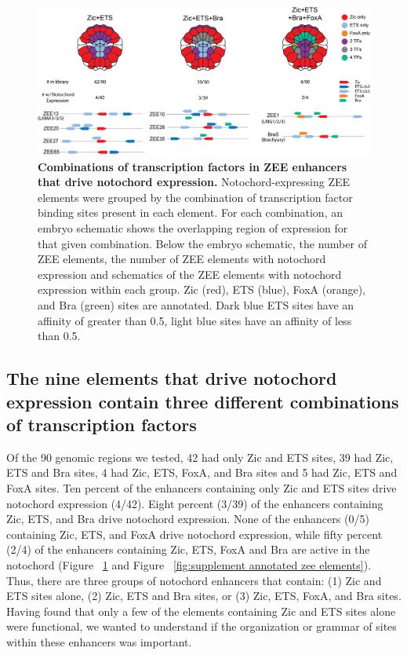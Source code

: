 \begin{figure}[h]
    \centering
    \includegraphics[scale=.55]{2_figures/Fig3_Notochord-Grammar-Groups.png}
    \caption[Combinations of transcription factors in ZEE enhancers that drive notochord expression]{\textbf{Combinations of transcription factors in ZEE enhancers that drive notochord expression.} Notochord-expressing ZEE elements were grouped by the combination of transcription factor binding sites present in each element. For each combination, an embryo schematic shows the overlapping region of expression for that given combination. Below the embryo schematic, the number of ZEE elements, the number of ZEE elements with notochord expression and schematics of the ZEE elements with notochord expression within each group. Zic (red), ETS (blue), FoxA (orange), and Bra (green) sites are annotated. Dark blue ETS sites have an affinity of greater than 0.5, light blue sites have an affinity of less than 0.5.}
    \label{fig:3 notochord enhancer groups}
\end{figure}

\subsection{The nine elements that drive notochord expression contain three different combinations of transcription factors}

Of the 90 genomic regions we tested, 42 had only Zic and ETS sites, 39 had Zic, ETS and Bra sites, 4 had Zic, ETS, FoxA, and Bra sites and 5 had Zic, ETS and FoxA sites. Ten percent of the enhancers containing only Zic and ETS sites drive notochord expression (4/42). Eight percent (3/39) of the enhancers containing Zic, ETS, and Bra drive notochord expression. None of the enhancers (0/5) containing Zic, ETS, and FoxA drive notochord expression, while fifty percent (2/4) of the enhancers containing Zic, ETS, FoxA and Bra are active in the notochord (Figure ~\ref{fig:3 notochord enhancer groups} and Figure ~\ref{fig:supplement annotated zee elements}). Thus, there are three groups of notochord enhancers that contain: (1) Zic and ETS sites alone, (2) Zic, ETS and Bra sites, or (3) Zic, ETS, FoxA, and Bra sites. Having found that only a few of the elements containing Zic and ETS sites alone were functional, we wanted to understand if the organization or grammar of sites within these enhancers was important.


